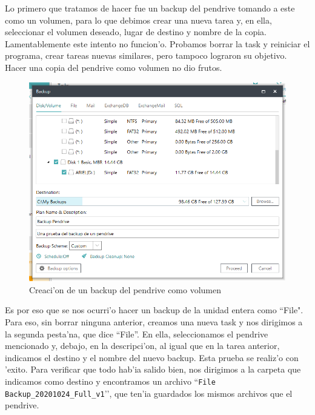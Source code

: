 \documentclass[11pt]{article}
\begin{document}
	Lo primero que tratamos de hacer fue un backup del pendrive tomando a este como un volumen, para lo que debimos crear una nueva tarea y, en ella, seleccionar el volumen deseado, lugar de destino y nombre de la copia. Lamentablemente este intento no funcion'o. Probamos borrar la task y reiniciar el programa, crear tareas nuevas similares, pero tampoco lograron su objetivo. Hacer una copia del pendrive como volumen no dio frutos.

    \begin{figure}[H]
		\centering
		\includegraphics[width=.8\textwidth]{Images/easeus/pendrive/1-bp_volumen.png}
		\caption{Creaci'on de un backup del pendrive como volumen}
		\label{bp_volumen}
	\end{figure}
	
	Es por eso que se nos ocurri'o hacer un backup de la unidad entera como ``File". Para eso, sin borrar ninguna anterior, creamos una nueva task y nos dirigimos a la segunda pesta'na, que dice “File”. En ella, seleccionamos el pendrive mencionado y, debajo, en la descripci'on, al igual que en la tarea anterior, indicamos el destino y el nombre del nuevo backup. Esta prueba se realiz'o con 'exito. Para verificar que todo hab'ia salido bien, nos dirigimos a la carpeta que indicamos como destino y encontramos un archivo ``\texttt{File Backup\_20201024\_Full\_v1}’’, que ten'ia guardados los mismos archivos que el pendrive. %
\end{document}
